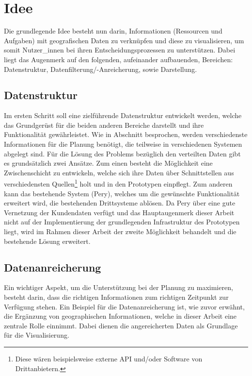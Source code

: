 \documentclass[Bachelorarbeit.tex]{subfiles}
\begin{document}
\section{Idee}
\label{chap:einfuehrung:sec:idee}

Die grundlegende Idee besteht nun darin, Informationen (Ressourcen und Aufgaben) mit geografischen Daten zu verknüpfen und diese zu visualisieren, um somit Nutzer\_innen bei ihren Entscheidungsprozessen zu unterstützen. 
Dabei liegt das Augenmerk auf den folgenden, aufeinander aufbauenden, Bereichen: Datenstruktur, Datenfilterung/-Anreicherung, sowie Darstellung.


\subsection*{Datenstruktur}
Im ersten Schritt soll eine zielführende Datenstruktur entwickelt werden, welche das Grundgerüst für die beiden anderen Bereiche darstellt und ihre Funktionalität gewährleistet.
Wie in Abschnitt  besprochen, werden verschiedenste Informationen für die Planung benötigt, die teilweise in verschiedenen Systemen abgelegt sind. 
Für die Lösung des Problems bezüglich den verteilten Daten gibt es grundsätzlich zwei Ansätze.
Zum einen besteht die Möglichkeit eine Zwischenschicht zu entwickeln, welche sich ihre Daten über Schnittstellen aus verschiedensten Quellen\footnote{Diese wären beispielsweise externe \ac{API} und/oder Software von Drittanbietern.} holt und in den Prototypen einpflegt.
Zum anderen kann das bestehende System (Pery), welches um die gewünschte Funktionalität erweitert wird, die bestehenden Drittsysteme ablösen. 
Da Pery über eine gute Vernetzung der Kundendaten verfügt und das Hauptaugenmerk dieser Arbeit nicht auf der Implementierung der grundlegenden Infrastruktur des Prototypen liegt, wird im Rahmen dieser Arbeit der zweite Möglichkeit behandelt und die bestehende Lösung erweitert.

\subsection*{Datenanreicherung}
Ein wichtiger Aspekt, um die Unterstützung bei der Planung zu maximieren, besteht darin, dass die richtigen Informationen zum richtigen Zeitpunkt zur Verfügung stehen. 
Ein Beispiel für die Datenanreicherung ist, wie zuvor erwähnt, die Ergänzung von geographischen Informationen, welche in dieser Arbeit eine zentrale Rolle einnimmt. 
Dabei dienen die angereicherten Daten als Grundlage für die Visualisierung.
\end{document}
